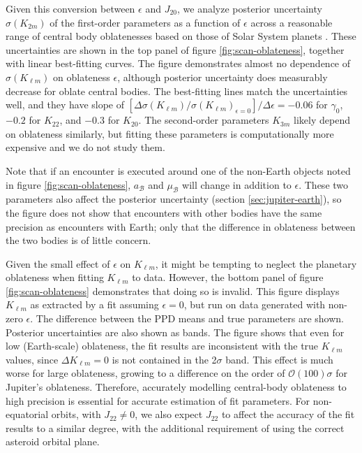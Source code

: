 \documentclass[fleqn,usenatbib]{mnras}
\begin{document}
Given this conversion between $\epsilon$ and $J_{20}$, we analyze posterior uncertainty $\sigma(K_{2 m})$ of the first-order parameters as a function of $\epsilon$ across a reasonable range of central body oblatenesses based on those of Solar System planets \cite{paterLissauer2015}. These uncertainties are shown in the top panel of figure \ref{fig:scan-oblateness}, together with linear best-fitting curves. The figure demonstrates almost no dependence of $\sigma(K_{\ell m})$ on oblateness $\epsilon$, although posterior uncertainty does measurably decrease for oblate central bodies. The best-fitting lines match the uncertainties well, and they have slope of $[\Delta \sigma(K_{\ell m}) / \sigma(K_{\ell m})_{\epsilon=0}] / \Delta \epsilon = -0.06$ for $\gamma_0$, $-0.2$ for $K_{22}$, and $-0.3$ for $K_{20}$. The second-order parameters $K_{3m}$ likely depend on oblateness similarly, but fitting these parameters is computationally more expensive and we do not study them.

Note that if an encounter is executed around one of the non-Earth objects noted in figure \ref{fig:scan-oblateness}, $a_\mathcal{B}$ and $\mu_\mathcal{B}$ will change in addition to $\epsilon$. These two parameters also affect the posterior uncertainty (section \ref{sec:jupiter-earth}), so the figure does not show that encounters with other bodies have the same precision as encounters with Earth; only that the difference in oblateness between the two bodies is of little concern.

Given the small effect of $\epsilon$ on $K_{\ell m}$, it might be tempting to neglect the planetary oblateness when fitting $K_{\ell m}$ to data. However, the bottom panel of figure \ref{fig:scan-oblateness} demonstrates that doing so is invalid. This figure displays $K_{\ell m}$ as extracted by a fit assuming $\epsilon = 0$, but run on data generated with non-zero $\epsilon$. The difference between the PPD means and true parameters are shown. Posterior uncertainties are also shown as bands. The figure shows that even for low (Earth-scale) oblateness, the fit results are inconsistent with the true $K_{\ell m}$ values, since $\Delta K_{\ell m} = 0$ is not contained in the 2$\sigma$ band. This effect is much worse for large oblateness, growing to a difference on the order of $\mathcal{O}(100)\sigma$ for Jupiter's oblateness. Therefore, accurately modelling central-body oblateness to high precision is essential for accurate estimation of fit parameters. For non-equatorial orbits, with $J_{22} \neq 0$, we also expect $J_{22}$ to affect the accuracy of the fit results to a similar degree, with the additional requirement of using the correct asteroid orbital plane.
\end{document}
